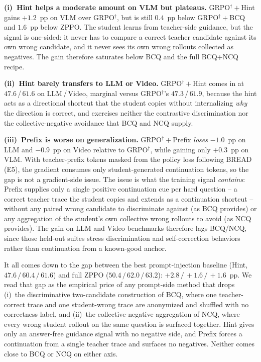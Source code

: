 \documentclass{llmxive}
\begin{document}
\textbf{(i)~Hint helps a moderate amount on VLM but plateaus.} GRPO$^{\dagger}\!+\!$Hint gains $+1.2$~pp on VLM over GRPO$^{\dagger}$, but is still $0.4$~pp below GRPO$^{\dagger}\!+\!$BCQ and $1.6$~pp below ZPPO. The student learns from teacher-side guidance, but the signal is one-sided: it never has to compare a correct teacher candidate against its own wrong candidate, and it never sees its own wrong rollouts collected as negatives. The gain therefore saturates below BCQ and the full BCQ+NCQ recipe.

\textbf{(ii)~Hint barely transfers to LLM or Video.} GRPO$^{\dagger}\!+\!$Hint comes in at $47.6$\,/\,$61.6$ on LLM\,/\,Video, marginal versus GRPO$^{\dagger}$'s $47.3$\,/\,$61.9$, because the hint acts as a directional shortcut that the student copies without internalizing \emph{why} the direction is correct, and exercises neither the contrastive discrimination nor the collective-negative avoidance that BCQ and NCQ supply.

\textbf{(iii)~Prefix is worse on generalization.} GRPO$^{\dagger}\!+\!$Prefix \emph{loses} $-1.0$~pp on LLM and $-0.9$~pp on Video relative to GRPO$^{\dagger}$, while gaining only $+0.3$~pp on VLM. With teacher-prefix tokens masked from the policy loss following BREAD (E5), the gradient consumes only student-generated continuation tokens, so the gap is not a gradient-side issue. The issue is what the training signal \emph{contains}: Prefix supplies only a single positive continuation cue per hard question -- a correct teacher trace the student copies and extends as a continuation shortcut -- without any paired wrong candidate to discriminate against (as BCQ provides) or any aggregation of the student's own collective wrong rollouts to avoid (as NCQ provides). The gain on LLM and Video benchmarks therefore lags BCQ/NCQ, since those held-out suites stress discrimination and self-correction behaviors rather than continuation from a known-good anchor.

It all comes down to the gap between the best prompt-injection baseline (Hint, $47.6\,/\,60.4\,/\,61.6$) and full ZPPO ($50.4\,/\,62.0\,/\,63.2$): $+2.8\,/\,+1.6\,/\,+1.6$~pp. We read that gap as the empirical price of any prompt-side method that drops (i)~the discriminative two-candidate construction of BCQ, where one teacher-correct trace and one student-wrong trace are anonymized and shuffled with no correctness label, and (ii)~the collective-negative aggregation of NCQ, where every wrong student rollout on the same question is surfaced together. Hint gives only an answer-free guidance signal with no negative side, and Prefix forces a continuation from a single teacher trace and surfaces no negatives. Neither comes close to BCQ or NCQ on either axis.
\end{document}
